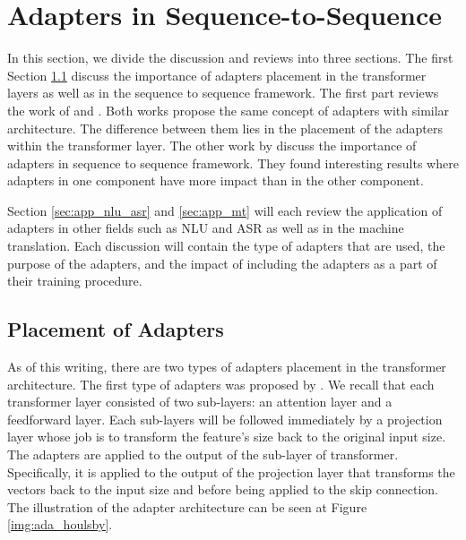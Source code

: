 \section{Adapters in Sequence-to-Sequence}
\label{sec:adapter_seq}

In this section, we divide the discussion and reviews into three sections. The first Section \ref{sec:adapter_place} discuss the importance of adapters placement in the transformer layers as well as in the sequence to sequence framework. The first part reviews the work of \cite{houlsby2019parameter} and \cite{bapna2019simple}. Both works propose the same concept of adapters with similar architecture. The difference between them lies in the placement of the adapters within the transformer layer. The other work by \cite{winata2020adapt} discuss the importance of adapters in sequence to sequence framework. They found interesting results where adapters in one component have more impact than in the other component.

Section \ref{sec:app_nlu_asr} and \ref{sec:app_mt} will each review the application of adapters in other fields such as NLU and ASR as well as in the machine translation. Each discussion will contain the type of adapters that are used, the purpose of the adapters, and the impact of including the adapters as a part of their training procedure.

\subsection{Placement of Adapters}
\label{sec:adapter_place}
As of this writing, there are two types of adapters placement in the transformer architecture. The first type of adapters was proposed by \cite{houlsby2019parameter}. We recall that each transformer layer consisted of two sub-layers: an attention layer and a feedforward layer. Each sub-layers will be followed immediately by a projection layer whose job is to transform the feature's size back to the original input size. The adapters are applied to the output of the sub-layer of transformer. Specifically, it is applied to the output of the projection layer that transforms the vectors back to the input size and before being applied to the skip connection. The illustration of the adapter architecture can be seen at Figure \ref{img:ada_houlsby}.

